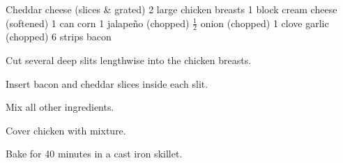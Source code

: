 \dishtype{\main}
\begin{ingreds}
    Cheddar cheese (slices \& grated)
    2 large chicken breasts
    1 block cream cheese (softened)
    1 can corn
    1 jalape\~no (chopped)
    $\frac{1}{2}$ onion (chopped)
    1 clove garlic (chopped)
    6 strips bacon
\end{ingreds}
\begin{method}
    Cut several deep slits lengthwise into the chicken breasts.\par
    Insert bacon and cheddar slices inside each slit.\par
    Mix all other ingredients.\par
    Cover chicken with mixture.\par
    Bake for 40 minutes in a cast iron skillet.
\end{method}